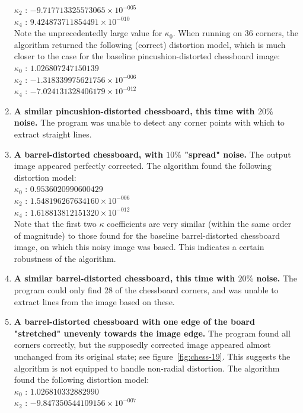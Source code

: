 \begin{enumerate}
   $ \kappa_{2}$ : $-9.717713325573065 \times 10^{-005}$\\
   $ \kappa_{4}$ : $9.424873711854491 \times 10^{-010}$\\
Note the unprecedentedly large value for $\kappa_{0}$. When running on 36 corners, the algorithm returned the following (correct) distortion model, which is much closer to the case for the baseline pincushion-distorted chessboard image:\\
   $ \kappa_{0}$ : $1.026807247150139$\\
   $ \kappa_{2}$ : $-1.318339975621756 \times 10^{-006}$\\
   $ \kappa_{4}$ : $-7.024131328406179 \times 10^{-012}$
  \item \textbf{A similar pincushion-distorted chessboard, this time with $20\%$ noise.} The program was unable to detect any corner points with which to extract straight lines.
  \item \textbf{A barrel-distorted chessboard, with $10\%$ "spread" noise.} The output image appeared perfectly corrected. The algorithm found the following distortion model:\\
   $ \kappa_{0}$ : $0.9536020990600429$\\
   $ \kappa_{2}$ : $1.548196267634160 \times 10^{-006}$\\
   $ \kappa_{4}$ : $1.618813812151320 \times 10^{-012}$\\
   Note that the first two $\kappa$ coefficients are very similar (within the same order of magnitude) to those found for the baseline barrel-distorted chessboard image, on which this noisy image was based. This indicates a certain robustness of the algorithm.
  \item \textbf{A similar barrel-distorted chessboard, this time with $20\%$ noise.} The program could only find 28 of the chessboard corners, and was unable to extract lines from the image based on these.
  \item \textbf{A barrel-distorted chessboard with one edge of the board "stretched" unevenly towards the image edge.} The program found all corners correctly, but the supposedly corrected image appeared almost unchanged from its original state; see figure~\ref{fig:chess-19}. This suggests the algorithm is not equipped to handle non-radial distortion. The algorithm found the following distortion model:\\
   $ \kappa_{0}$ : $1.026810332882990$\\
   $ \kappa_{2}$ : $-9.847350544109156 \times 10^{-007}$\\

\end{enumerate}
